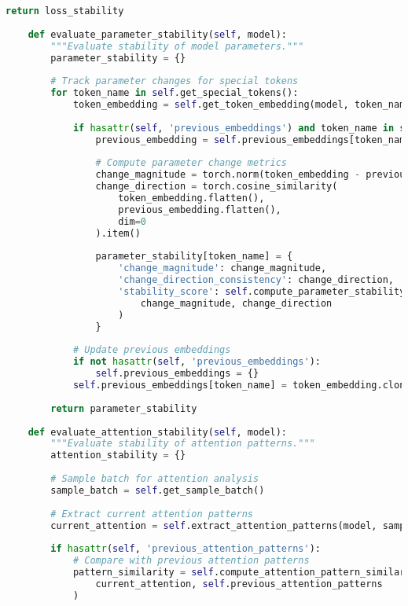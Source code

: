 \begin{lstlisting}[language=Python, caption=Comprehensive evaluation metrics framework for special token training]
        return loss_stability
    
    def evaluate_parameter_stability(self, model):
        """Evaluate stability of model parameters."""
        parameter_stability = {}
        
        # Track parameter changes for special tokens
        for token_name in self.get_special_tokens():
            token_embedding = self.get_token_embedding(model, token_name)
            
            if hasattr(self, 'previous_embeddings') and token_name in self.previous_embeddings:
                previous_embedding = self.previous_embeddings[token_name]
                
                # Compute parameter change metrics
                change_magnitude = torch.norm(token_embedding - previous_embedding).item()
                change_direction = torch.cosine_similarity(
                    token_embedding.flatten(), 
                    previous_embedding.flatten(), 
                    dim=0
                ).item()
                
                parameter_stability[token_name] = {
                    'change_magnitude': change_magnitude,
                    'change_direction_consistency': change_direction,
                    'stability_score': self.compute_parameter_stability_score(
                        change_magnitude, change_direction
                    )
                }
            
            # Update previous embeddings
            if not hasattr(self, 'previous_embeddings'):
                self.previous_embeddings = {}
            self.previous_embeddings[token_name] = token_embedding.clone().detach()
        
        return parameter_stability
    
    def evaluate_attention_stability(self, model):
        """Evaluate stability of attention patterns."""
        attention_stability = {}
        
        # Sample batch for attention analysis
        sample_batch = self.get_sample_batch()
        
        # Extract current attention patterns
        current_attention = self.extract_attention_patterns(model, sample_batch)
        
        if hasattr(self, 'previous_attention_patterns'):
            # Compare with previous attention patterns
            pattern_similarity = self.compute_attention_pattern_similarity(
                current_attention, self.previous_attention_patterns
            )
            

\end{lstlisting}
